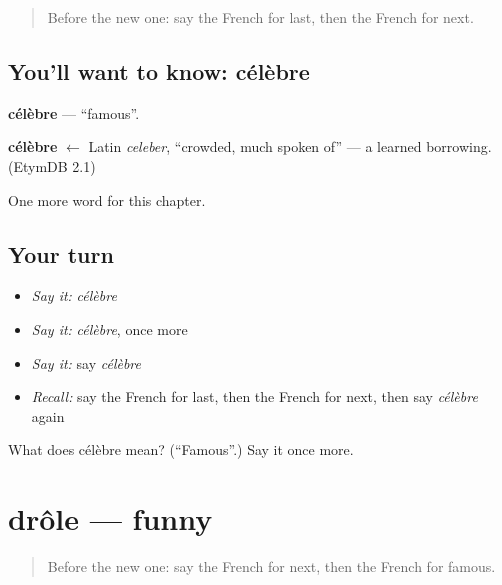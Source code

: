 \label{lesson:FR-C132-celebre}



\begin{quote}
Before the new one: say the French for last, then the French for next.
\end{quote}

\subsection*{You'll want to know: célèbre}
\textbf{célèbre} — \textquotedblleft{}famous\textquotedblright{}.

\begin{cousinweb}
\textbf{célèbre} $\leftarrow$ Latin \emph{celeber}, \textquotedblleft{}crowded, much spoken of\textquotedblright{} — a learned borrowing. (EtymDB 2.1)
\end{cousinweb}

\begin{grammarlens}[title={What you've built}]
One more word for this chapter.
\end{grammarlens}

\subsection*{Your turn}
\begin{itemize}
\raggedright
  \item \emph{Say it:} \emph{célèbre}
  \item \emph{Say it:} \emph{célèbre}, once more
  \item \emph{Say it:} say \emph{célèbre}
  \item \emph{Recall:} say the French for last, then the French for next, then say \emph{célèbre} again
\end{itemize}

\begin{tcolorbox}[breakable,colback=teal!4,colframe=teal!35!black,title={Before you move on}]
What does célèbre mean? (\textquotedblleft{}Famous\textquotedblright{}.) Say it once more.
\end{tcolorbox}
\section[drôle]{drôle — funny}

\label{lesson:FR-C132-drole}



\begin{quote}
Before the new one: say the French for next, then the French for famous.
\end{quote}

